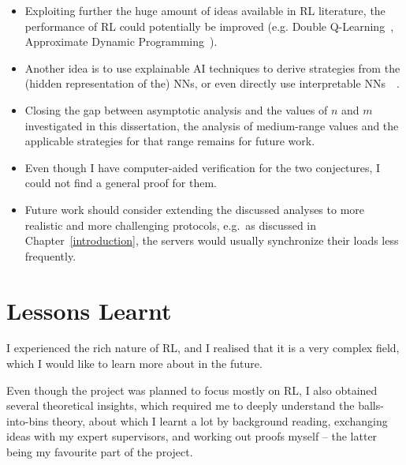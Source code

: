 \begin{itemize}
    \item Exploiting further the huge amount of ideas available in RL literature, the performance of RL could potentially be improved (e.g. Double Q-Learning~\cite{hasselt2010doubleqlearning}, Approximate Dynamic Programming~\cite{bellman1959approximatedp}).
    \item Another idea is to use explainable AI techniques to derive strategies from the (hidden representation of the) NNs, or even directly use interpretable NNs~\cite{vacareanu2022explainableAI1}~\cite{tang2022explainableAI2}.
    \item Closing the gap between asymptotic analysis and the values of $n$ and $m$ investigated in this dissertation, the analysis of medium-range values and the applicable strategies for that range remains for future work.
    \item Even though I have computer-aided verification for the two conjectures, I could not find a general proof for them.
    \item Future work should consider extending the discussed analyses to more realistic and more challenging protocols, e.g.\ as discussed in Chapter~\ref{introduction}, the servers would usually synchronize their loads less frequently.
\end{itemize}

 

\iffalse %
It is definitely possible to try improving RL, and hopefully get closer to the optimal strategies. For example, double learning~\cite{hasselt2010doubleqlearning}, which argues that vanilla (deep) Q-Learning overestimates the action values by under the hood using $\mathbb{E}[\max_a(Q(s,a)]$ instead of $\max_a(\mathbb{E}[Q(s,a)])$. Another idea is approximate dynamic programming \cite{bellman1959approximatedp} which can potentially make better use of the fully known environment for the agent.
\fi




\section{Lessons Learnt}

I experienced the rich nature of RL, and I realised that it is a very complex field, which I would like to learn more about in the future. 

Even though the project was planned to focus mostly on RL, I also obtained several theoretical insights, which required me to deeply understand the balls-into-bins theory, about which I learnt a lot by background reading, exchanging ideas with my expert supervisors, and working out proofs myself -- the latter being my favourite part of the project.

